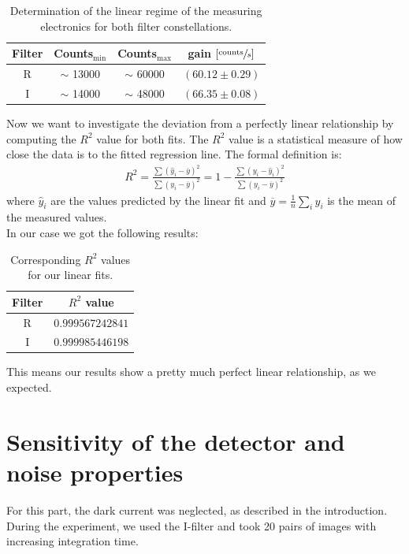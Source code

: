 \begin{table}[H]
\setlength{\tabcolsep}{5mm}
\setlength\extrarowheight{2mm}
\centering
\begin{tabular}{c| c c c }

Filter  & Counts$_{\text{min}}$ & Counts$_{\text{max}}$ & gain $\left[\sfrac{\text{counts}}{s}\right]$ \\ \hline 

R & $\sim$ 13000 & $\sim$ 60000 & $(60.12 \pm 0.29)$ \\
I & $\sim$ 14000 & $\sim$ 48000 & $(66.35 \pm 0.08)$ \\

\end{tabular}
\caption{Determination of the linear regime of the measuring electronics for both filter constellations.}
\end{table}
Now we want to investigate the deviation from a perfectly linear relationship by computing the $R^2$ value for both fits. The $R^2$ value is a statistical measure of how close the data is to the fitted regression line. 
The formal definition is:
\begin{align}
	R^2 = 
\frac{\displaystyle\sum\nolimits \left(\hat{y}_i- \overline{y}\right)^2}{\displaystyle\sum\nolimits \left(y_i - \overline{y}\right)^2} 
 =1-\frac{\displaystyle\sum\nolimits \left(y_i - \hat{y}_i\right)^2}{\displaystyle\sum\nolimits \left(y_i - \overline{y}\right)^2}
\end{align}
where $\hat{y}_i$ are the values predicted by the linear fit and $\overline{y} = \frac{1}{n}\sum_{i} y_i$ is the mean of the measured values.\\
In our case we got the following results: 
\begin{table}[H]
\setlength{\tabcolsep}{5mm}
\setlength\extrarowheight{2mm}
\centering
\begin{tabular}{c| c}

Filter  & $ R^2 $ value \\ \hline 

R & $0.999567242841$ \\
I & $0.999985446198$ \\

\end{tabular}
\caption{Corresponding $R^2$ values for our linear fits.}
\end{table}

This means our results show a pretty much perfect linear relationship, as we expected.

\section{Sensitivity of the detector and noise properties}
For this part, the dark current was neglected, as described in the introduction.
During the experiment, we used the I-filter and took 20 pairs of images with increasing integration time.

